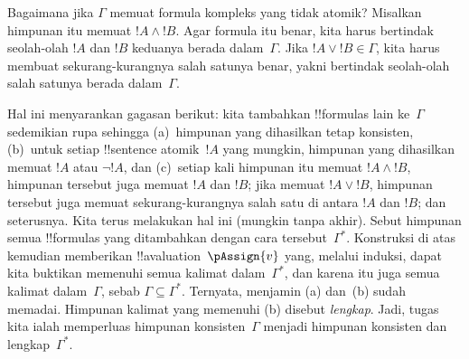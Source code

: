 \documentclass[../../../include/open-logic-section]{subfiles}
\begin{document}
Bagaimana jika $\Gamma$ memuat formula kompleks yang tidak atomik?
Misalkan himpunan itu memuat $!A \land !B$. Agar formula itu benar, kita
harus bertindak seolah-olah $!A$ dan $!B$ keduanya berada
dalam~$\Gamma$. Jika $!A \lor !B \in \Gamma$, kita harus membuat
sekurang-kurangnya salah satunya benar, yakni bertindak seolah-olah salah
satunya berada dalam~$\Gamma$.

Hal ini menyarankan gagasan berikut: kita tambahkan !!{formula}s lain
ke~$\Gamma$ sedemikian rupa sehingga (a)~himpunan yang dihasilkan tetap
konsisten, (b)~untuk setiap !!{sentence} atomik~$!A$ yang mungkin,
himpunan yang dihasilkan memuat $!A$ atau $\lnot !A$, dan (c)~setiap
kali himpunan itu memuat $!A \land !B$, himpunan tersebut juga memuat
$!A$ dan $!B$; jika memuat $!A \lor !B$, himpunan tersebut juga memuat
sekurang-kurangnya salah satu di antara $!A$ dan $!B$; dan seterusnya.
Kita terus melakukan hal ini (mungkin tanpa akhir). Sebut himpunan semua
!!{formula}s yang ditambahkan dengan cara tersebut~$\Gamma^*$. Konstruksi
di atas kemudian memberikan 
{!!a{valuation}~$\pAssign{v}$} yang, melalui induksi, dapat kita buktikan
memenuhi semua kalimat dalam~$\Gamma^*$, dan karena itu juga semua
kalimat dalam~$\Gamma$, sebab $\Gamma \subseteq \Gamma^*$. Ternyata,
menjamin (a) dan~(b) sudah memadai. Himpunan kalimat yang memenuhi (b)
disebut \emph{lengkap}. Jadi, tugas kita ialah memperluas himpunan
konsisten~$\Gamma$ menjadi himpunan konsisten dan lengkap~$\Gamma^*$.
\end{document}
